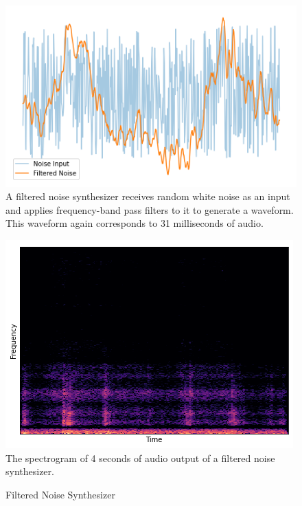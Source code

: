 \begin{figure}
\centering
\begin{minipage}[b]{0.45\textwidth}
    \includegraphics[width=\textwidth]{figures/filtered_noise_wave.png}
    \small A filtered noise synthesizer receives random white noise as an input and applies frequency-band pass filters to it to generate a waveform. This waveform again corresponds to 31 milliseconds of audio.
  \end{minipage}
  \hfill
  \begin{minipage}[b]{0.45\textwidth}
    \includegraphics[width=\textwidth]{figures/filtered_noise_spectro.png}
    \small The spectrogram of 4 seconds of audio output of a filtered noise synthesizer.
\end{minipage}
\caption{Filtered Noise Synthesizer}
\label{fig:filtered_noise}
\end{figure}



